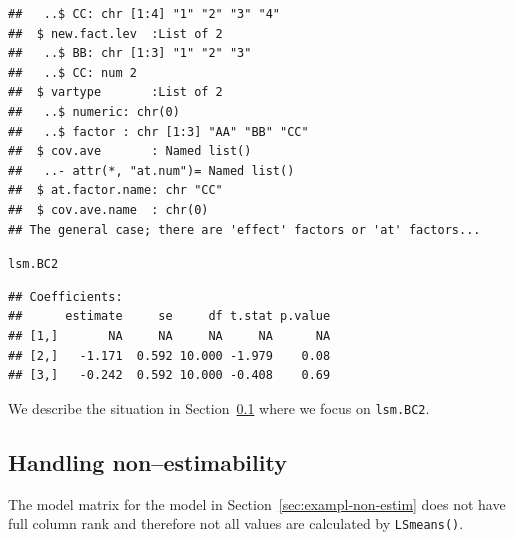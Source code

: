 \documentclass[10pt]{article}\usepackage[]{graphicx}\usepackage[]{color}
\makeatletter
\newcommand{\hlstd}[1]{\textcolor[rgb]{0.345,0.345,0.345}{#1}}%
\newenvironment{kframe}{%
 \def\at@end@of@kframe{}%
 \ifinner\ifhmode%
  \def\at@end@of@kframe{\end{minipage}}%
  \begin{minipage}{\columnwidth}%
 \fi\fi%
 \def\FrameCommand##1{\hskip\@totalleftmargin \hskip-\fboxsep
 \colorbox{shadecolor}{##1}\hskip-\fboxsep
     \hskip-\linewidth \hskip-\@totalleftmargin \hskip\columnwidth}%
 \MakeFramed {\advance\hsize-\width
   \@totalleftmargin\z@ \linewidth\hsize
   \@setminipage}}%
 {\par\unskip\endMakeFramed%
 \at@end@of@kframe}
\newenvironment{knitrout}{}{} %
\def\cc#1{\texttt{#1}}
\makeatother
\begin{document}
\begin{knitrout}
\begin{kframe}
\begin{verbatim}
##   ..$ CC: chr [1:4] "1" "2" "3" "4"
##  $ new.fact.lev  :List of 2
##   ..$ BB: chr [1:3] "1" "2" "3"
##   ..$ CC: num 2
##  $ vartype       :List of 2
##   ..$ numeric: chr(0) 
##   ..$ factor : chr [1:3] "AA" "BB" "CC"
##  $ cov.ave       : Named list()
##   ..- attr(*, "at.num")= Named list()
##  $ at.factor.name: chr "CC"
##  $ cov.ave.name  : chr(0) 
## The general case; there are 'effect' factors or 'at' factors...
\end{verbatim}
\begin{alltt}
\hlstd{lsm.BC2}
\end{alltt}
\begin{verbatim}
## Coefficients:
##      estimate     se     df t.stat p.value
## [1,]       NA     NA     NA     NA      NA
## [2,]   -1.171  0.592 10.000 -1.979    0.08
## [3,]   -0.242  0.592 10.000 -0.408    0.69
\end{verbatim}
\end{kframe}
\end{knitrout}

We describe the situation in 
Section~\ref{sec:handl-non-estim} where we focus on \verb|lsm.BC2|.

\subsection{Handling non--estimability}
\label{sec:handl-non-estim}

The model matrix for the model in Section~\ref{sec:exampl-non-estim}
does not have full column rank and therefore not all values are
calculated by \cc{LSmeans()}.
\end{document}
